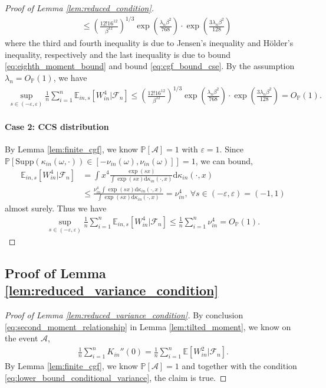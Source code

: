 \documentclass[12pt]{article}
\theoremstyle{definition}
\def\P{\mathbb{P}}
\def\P{\mathbb{P}}
\newcommand{\E}{\mathbb E}								%
\renewcommand{\P}{\mathbb{P}}							%
\begin{document}
\begin{proof}[Proof of Lemma \ref{lem:reduced_condition}]
\begin{align*}
		&
		\leq \left(\frac{12!16^{12}}{\beta^{12}}\right)^{1/3}\exp\left(\frac{\lambda_n\beta^2}{768}\right)\cdot \exp\left(\frac{3\lambda_n\beta^2}{128}\right)
	\end{align*}
	where the third and fourth inequality is due to Jensen's inequality and H\"older's inequality, respectively and the last inequality is due to bound \eqref{eq:eighth_moment_bound} and bound \eqref{eq:cgf_bound_cse}. By the assumption $\lambda_n=O_{\P}(1)$, we have
	\begin{align*}
		\sup_{s\in (-\varepsilon,\varepsilon)}\frac{1}{n}\sum_{i=1}^n \E_{in,s}[W_{in}^4|\mathcal{F}_n]\leq \left(\frac{12!16^{12}}{\beta^{12}}\right)^{1/3}\exp\left(\frac{\lambda_n\beta^2}{768}\right)\cdot \exp\left(\frac{3\lambda_n\beta^2}{128}\right)=O_{\P}(1).
	\end{align*}

	\paragraph{Case 2: CCS distribution}

	By Lemma \ref{lem:finite_cgf}, we know $\P[\mathcal{A}]=1$ with $\varepsilon=1$. Since $\P[\mathrm{Supp}(\kappa_{in}(\omega,\cdot))\in [-\nu_{in}(\omega),\nu_{in}(\omega)]]=1$, we can bound, 
	\begin{align*}
		\E_{in,s}\left[W_{in}^4|\mathcal{F}_n\right]
		&
		=\int x^4\frac{\exp(sx)}{\int \exp(sx)\mathrm{d}\kappa_{in}(\cdot,x)}\mathrm{d}\kappa_{in}(\cdot,x)\\
		&
		\leq \frac{\nu_{in}^4\int \exp(sx)\mathrm{d}\kappa_{in}(\cdot,x)}{\int \exp(sx)\mathrm{d}\kappa_{in}(\cdot,x)}= \nu_{in}^4,\ \forall s\in (-\varepsilon,\varepsilon)=(-1,1)
	\end{align*}
	almost surely. Thus we have 
	\begin{align*}
		\sup_{s\in (-\varepsilon,\varepsilon)}\frac{1}{n}\sum_{i=1}^n \E_{in,s}\left[W_{in}^4|\mathcal{F}_n\right]\leq \frac{1}{n}\sum_{i=1}^n \nu_{in}^4=O_{\P}(1).
	\end{align*}
\end{proof}

\subsection{Proof of Lemma \ref{lem:reduced_variance_condition}}

\begin{proof}[Proof of Lemma \ref{lem:reduced_variance_condition}]
	By conclusion \eqref{eq:second_moment_relationship} in Lemma \ref{lem:tilted_moment}, we know on the event $\mathcal{A}$,
	\begin{align*}
		\frac{1}{n}\sum_{i=1}^n K_{in}''(0)=\frac{1}{n}\sum_{i=1}^n \E[W_{in}^2|\mathcal{F}_n].
	\end{align*}
	By Lemma \ref{lem:finite_cgf}, we know $\P[\mathcal{A}]=1$ and together with the condition \eqref{eq:lower_bound_conditional_variance}, the claim is true.
\end{proof}
\end{document}
